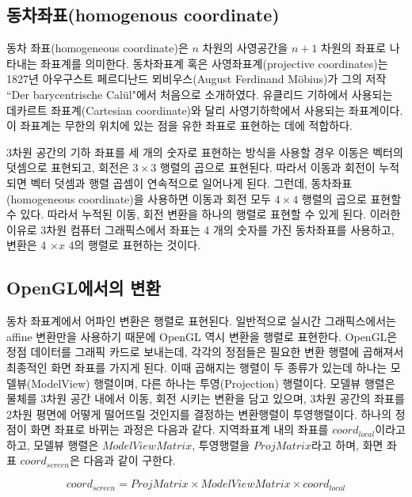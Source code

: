 \subsection{동차좌표(homogenous coordinate)}

동차 좌표(homogeneous coordinate)은 $n$ 차원의 사영공간을 $n+1$ 차원의 좌표로 나타내는 좌표계를 의미한다.
동차좌표계 혹은 사영좌표계(projective coordinates)는 1827년 아우구스트 페르디난드 뫼비우스(August Ferdinand M\"{o}bius)가 그의 저작 ``Der barycentrische Cal\"{u}l"에서 처음으로 소개하였다. 유클리드 기하에서 사용되는 데카르트 좌표계(Cartesian coordinate)와 달리 사영기하학에서 사용되는 좌표계이다. 이 좌표계는 무한의 위치에 있는 점을 유한 좌표로 표현하는 데에 적합하다.

3차원 공간의 기하 좌표를 세 개의 숫자로 표현하는 방식을 사용할 경우 이동은 벡터의 덧셈으로 표현되고, 회전은 $3 \times 3$ 행렬의 곱으로 표현된다. 따라서 이동과 회전이 누적되면 벡터 덧셈과 행렬 곱셈이 연속적으로 일어나게 된다. 그런데, 동차좌표(homogeneous coordinate)을 사용하면 이동과 회전 모두 $4 \times 4$ 행렬의 곱으로 표현할 수 있다. 따라서 누적된 이동, 회전 변환을 하나의 행렬로 표현할 수 있게 된다.
이러한 이유로 3차원 컴퓨터 그래픽스에서 좌표는 4 개의 숫자를 가진 동차좌표를 사용하고, 변환은 4 $\times x$ 4의 행렬로 표현하는 것이다.


\subsection{OpenGL에서의 변환}
동차 좌표계에서 어파인 변환은 행렬로 표현된다. 일반적으로 실시간 그래픽스에서는 affine 변환만을 사용하기 때문에 OpenGL 역시 변환을 행렬로 표현한다. OpenGL은 정점 데이터를 그래픽 카드로 보내는데, 각각의 정점들은 필요한 변환 행렬에 곱해져서 최종적인 화면 좌표를 가지게 된다. 이때 곱해지는 행렬이 두 종류가 있는데 하나는 모델뷰(ModelView) 행렬이며, 다른 하나는 투영(Projection) 행렬이다. 모델뷰 행렬은 물체를 3차원 공간 내에서 이동, 회전 시키는 변환을 담고 있으며, 3차원 공간의 좌표를 2차원 평면에 어떻게 떨어뜨릴 것인지를 결정하는 변환행렬이 투영행렬이다. 하나의 정점이 화면 좌표로 바뀌는 과정은 다음과 같다. 지역좌표계 내의 좌표를 $coord_{local}$이라고 하고, 모델뷰 행렬은 $ModelViewMatrix$, 투영행렬을 $ProjMatrix$라고 하며, 화면 좌표 $coord_{screen}$은 다음과 같이 구한다.

$$coord_{screen} = ProjMatrix  \times ModelViewMatrix \times coord_{local}$$

